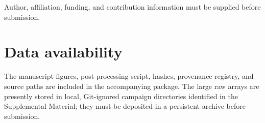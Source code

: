 \documentclass[aps,prl,reprint,superscriptaddress,nofootinbib]{revtex4-2}
\begin{document}
\begin{acknowledgments}
Author, affiliation, funding, and contribution information must be supplied before submission.
\end{acknowledgments}

\section*{Data availability}
The manuscript figures, post-processing script, hashes, provenance registry, and source paths are included in the accompanying package.  The large raw arrays are presently stored in local, Git-ignored campaign directories identified in the Supplemental Material; they must be deposited in a persistent archive before submission.


\end{document}
